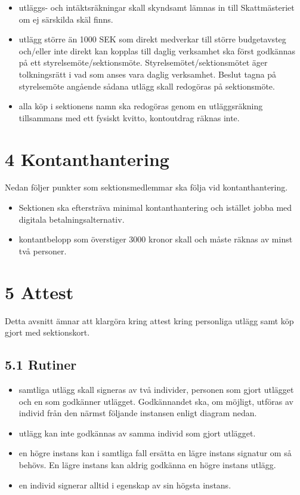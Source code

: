 \documentclass[]{dsekkallelse}
\begin{document}
\begin{itemize}
    \item utläggs- och intäktsräkningar skall skyndsamt lämnas in till Skattmästeriet om ej särskilda skäl finns.

    \item utlägg större än 1000 SEK som direkt medverkar till större budgetavsteg och/eller inte direkt kan kopplas till daglig verksamhet ska först godkännas på ett styrelsemöte/sektionsmöte. Styrelsemötet/sektionsmötet äger tolkningsrätt i vad som anses vara daglig verksamhet. Beslut tagna på styrelsemöte angående sådana utlägg skall redogöras på sektionsmöte.

    \item alla köp i sektionens namn ska redogöras genom en utläggsräkning tillsammans med ett fysiskt kvitto, kontoutdrag räknas inte.
\end{itemize}

\section{4 Kontanthantering}
Nedan följer punkter som sektionsmedlemmar ska följa vid kontanthantering.
\begin{itemize}
    \item Sektionen ska eftersträva minimal kontanthantering och istället jobba med digitala betalningsalternativ.
    \item kontantbelopp som överstiger 3000 kronor skall och måste räknas av minst två personer.
\end{itemize}

\section{5 Attest}
Detta avsnitt ämnar att klargöra kring attest kring personliga utlägg samt köp gjort med sektionskort.

\subsection{5.1 Rutiner}
\begin{itemize}
    \item samtliga utlägg skall signeras av två individer, personen som gjort utlägget och en som godkänner utlägget. Godkännandet ska, om möjligt, utföras av individ från den närmst följande instansen enligt diagram nedan.
    \item utlägg kan inte godkännas av samma individ som gjort utlägget.
    \item en högre instans kan i samtliga fall ersätta en lägre instans signatur om så behövs. En lägre instans kan aldrig godkänna en högre instans utlägg.
    \item en individ signerar alltid i egenskap av sin högsta instans.
\end{itemize}
\end{document}
